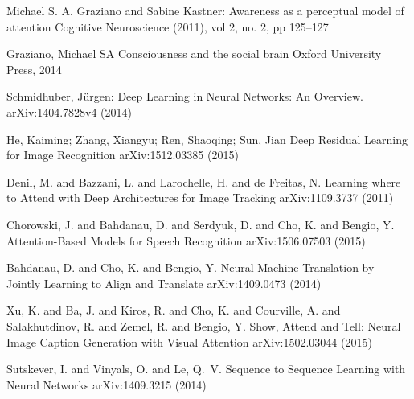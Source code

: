 \documentclass[citeauthoryear]{llncs}
\begin{document}
\begin{thebibliography}{}


Michael S. A.   Graziano  and  Sabine   Kastner:
Awareness as a perceptual model of attention
Cognitive Neuroscience (2011), vol 2, no. 2, pp 125--127


Graziano, Michael SA
Consciousness and the social brain
Oxford University Press, 2014



Schmidhuber, J{\"u}rgen:
Deep Learning in Neural Networks: An Overview.
arXiv:1404.7828v4 (2014)


He, Kaiming; Zhang, Xiangyu; Ren, Shaoqing; Sun, Jian
Deep Residual Learning for Image Recognition
arXiv:1512.03385 (2015)


{Denil}, M. and {Bazzani}, L. and {Larochelle}, H. and {de Freitas}, N.
Learning where to Attend with Deep Architectures for Image Tracking
arXiv:1109.3737 (2011)

{Chorowski}, J. and {Bahdanau}, D. and {Serdyuk}, D. and {Cho}, K. and {Bengio}, Y.
Attention-Based Models for Speech Recognition
arXiv:1506.07503 (2015)


{Bahdanau}, D. and {Cho}, K. and {Bengio}, Y.
Neural Machine Translation by Jointly Learning to Align and Translate
arXiv:1409.0473 (2014)



{Xu}, K. and {Ba}, J. and {Kiros}, R. and {Cho}, K. and {Courville}, A. and {Salakhutdinov}, R. and {Zemel}, R. and {Bengio}, Y.
Show, Attend and Tell: Neural Image Caption Generation with Visual Attention
arXiv:1502.03044 (2015)


{Sutskever}, I. and {Vinyals}, O. and {Le}, Q.~V.
Sequence to Sequence Learning with Neural Networks
arXiv:1409.3215 (2014)


\end{thebibliography}
\end{document}
